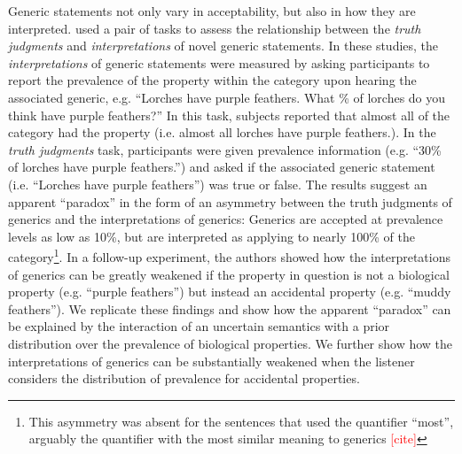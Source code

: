 \documentclass[10pt,letterpaper]{article}
\newcommand{\red}[1]{\textcolor{Red}{#1}}
\begin{document}
Generic statements not only vary in acceptability, but also in how they are interpreted.  used a pair of tasks to assess the relationship between the \emph{truth judgments} and \emph{interpretations} of novel generic statements. In these studies, the \emph{interpretations} of generic statements were measured by asking participants to report the prevalence of the property within the category upon hearing the associated generic, e.g. ``Lorches have purple feathers. What \% of lorches do you think have purple feathers?'' In this task, subjects reported that almost all of the category had the property (i.e. almost all lorches have purple feathers.). In the \emph{truth judgments} task, participants were given prevalence information (e.g. ``30\% of lorches have purple feathers.'') and asked if the associated generic statement (i.e. ``Lorches have purple feathers'') was true or false. The results suggest an apparent ``paradox'' in the form of an asymmetry between the truth judgments of generics and the interpretations of generics:  Generics are accepted at prevalence levels as low as 10\%, but are interpreted as applying to nearly 100\% of the category\footnote{This asymmetry was absent for the sentences that used the quantifier ``most'', arguably the quantifier with the most similar meaning to generics \red{[cite]}}.  In a follow-up experiment, the authors showed how the interpretations of generics can be greatly weakened if the property in question is not a biological property (e.g. ``purple feathers'') but instead an accidental property (e.g. ``muddy feathers''). We replicate these findings and show how the apparent ``paradox'' can be explained by the interaction of an uncertain semantics with a prior distribution over the prevalence of biological properties. We further show how the interpretations of generics can be substantially weakened when the listener considers the distribution of prevalence for accidental properties.

%
\end{document}
